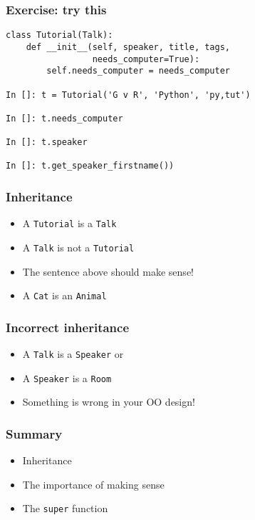 \documentclass[14pt,compress,aspectratio=169]{beamer}
\begin{document}
\begin{frame}[fragile]
  \frametitle{Exercise: try this}
\begin{lstlisting}
class Tutorial(Talk):
    def __init__(self, speaker, title, tags,
                 needs_computer=True):
        self.needs_computer = needs_computer

In []: t = Tutorial('G v R', 'Python', 'py,tut')

In []: t.needs_computer

In []: t.speaker

In []: t.get_speaker_firstname())

\end{lstlisting}
\end{frame}

\begin{frame}
  \frametitle{Inheritance}
  \begin{itemize}
  \item A \lstinline{Tutorial} is a \lstinline{Talk}
  \item A \lstinline{Talk} is not a \lstinline{Tutorial}
  \item The sentence above should make sense!
  \item A \lstinline{Cat} is an \lstinline{Animal}
  \end{itemize}
\end{frame}

\begin{frame}
  \frametitle{Incorrect inheritance}
  \begin{itemize}
  \item A \lstinline{Talk} is a \lstinline{Speaker} or
  \item A \lstinline{Speaker} is a \lstinline{Room}
  \item Something is wrong in your OO design!
  \end{itemize}
\end{frame}

\begin{frame}[fragile]
  \frametitle{Summary}
  \begin{itemize}
  \item Inheritance
  \item The importance of making sense
  \item The \lstinline{super} function
  \end{itemize}
\end{frame}
\end{document}
